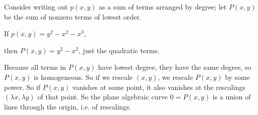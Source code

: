Consider writing out \(p(x,y)\) as a sum of terms arranged by degree; let \(P(x,y)\) be the sum of nonzero terms of lowest order.
\begin{example}
If \(p(x,y)=y^2-x^2-x^3\),
\begin{center}
\pgfplotsset{compat=1.12,width=7cm}%

\end{center}
then \(P(x,y)=y^2-x^2\), just the quadratic terms.
\end{example}
Because all terms in \(P(x,y)\) have lowest degree, they have the same degree, so \(P(x,y)\) is homogeneous.
So if we rescale \((x,y)\), we rescale \(P(x,y)\) by some power.
So if \(P(x,y)\) vanishes at some point, it also vanishes at the rescalings \((\lambda x,\lambda y)\) of that point.
So the plane algebraic curve \(0=P(x,y)\) is a union of lines through the origin, i.e. of rescalings.

